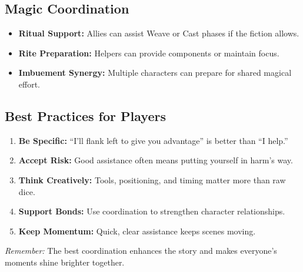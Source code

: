 \subsection{Magic Coordination}
\begin{itemize}
  \item \textbf{Ritual Support:} Allies can assist Weave or Cast phases if the fiction allows.
  \item \textbf{Rite Preparation:} Helpers can provide components or maintain focus.
  \item \textbf{Imbuement Synergy:} Multiple characters can prepare for shared magical effort.
\end{itemize}

\subsection{Best Practices for Players}
\begin{enumerate}
  \item \textbf{Be Specific:} “I'll flank left to give you advantage” is better than “I help.”
  \item \textbf{Accept Risk:} Good assistance often means putting yourself in harm's way.
  \item \textbf{Think Creatively:} Tools, positioning, and timing matter more than raw dice.
  \item \textbf{Support Bonds:} Use coordination to strengthen character relationships.
  \item \textbf{Keep Momentum:} Quick, clear assistance keeps scenes moving.
\end{enumerate}

\emph{Remember:} The best coordination enhances the story and makes everyone's moments shine brighter together.